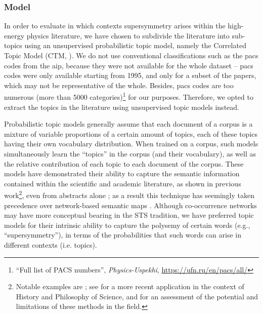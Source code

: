 \documentclass[smallextended]{svjour3}
\begin{document}
\subsubsection{Model}

In order to evaluate in which contexts supersymmetry arises within the high-energy physics literature, we have chosen to subdivide the literature into sub-topics using an unsupervised probabilistic topic model, namely the Correlated Topic Model (CTM, \citealt{Blei2007}). We do not use conventional classifications such as the \gls{pacs} codes from the \gls{aip}, because they were not available for the whole dataset -- \gls{pacs} codes were only available starting from 1995, and only for a subset of the papers, which may not be representative of the whole. Besides, \gls{pacs} codes are too numerous (more than 5000 categories)\footnote{``Full list of PACS numbers'', \textit{
Physics-Uspekhi}, \url{https://ufn.ru/en/pacs/all/}} for our purposes. Therefore, we opted to extract the topics in the literature using unsupervised topic models instead. %

Probabilistic topic models generally assume that each document of a corpus is a mixture of variable proportions of a certain amount of topics, each of these topics having their own vocabulary distribution. When trained on a corpus, such models simultaneously learn the ``topics'' in the corpus (and their vocabulary), as well as the relative contribution of each topic to each document of the corpus. These models have demonstrated their ability to capture the semantic information contained within the scientific and academic literature, as shown in previous work\footnote{Notable examples are \citealt{Nichols2014,Hall2008,Griffiths2004}; see \citealt{Malaterre2022} for a more recent application in the context of History and Philosophy of Science, and \citealt{Allen2022} for an assessment of the potential and limitations of these methods in the field.}, even from abstracts alone \citep{Syed2017}; as a result this technique has seemingly taken precedence over network-based semantic maps \citep[Figure~1]{Leydesdorff2016}.  Although co-occurrence networks may have more conceptual bearing in the STS tradition, we have preferred topic models for their intrinsic ability to capture the polysemy of certain words (e.g., ``supersymmetry''), in terms of the probabilities that such words can arise in different contexts (i.e. topics).
\end{document}
